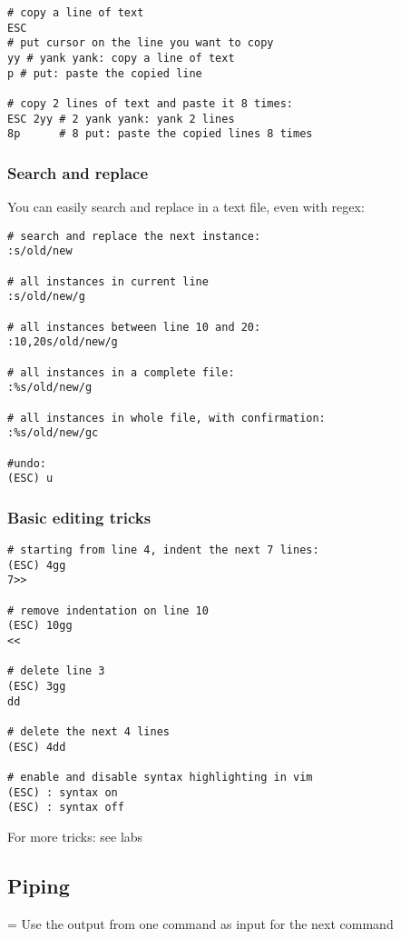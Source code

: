 \documentclass{article}
\begin{document}
\begin{verbatim}
# copy a line of text
ESC
# put cursor on the line you want to copy
yy # yank yank: copy a line of text
p # put: paste the copied line

# copy 2 lines of text and paste it 8 times:
ESC 2yy # 2 yank yank: yank 2 lines
8p      # 8 put: paste the copied lines 8 times
\end{verbatim}

\subsubsection{Search and replace}

You can easily search and replace in a text file, even with regex:

\begin{verbatim}
# search and replace the next instance:
:s/old/new

# all instances in current line
:s/old/new/g

# all instances between line 10 and 20:
:10,20s/old/new/g

# all instances in a complete file:
:%s/old/new/g

# all instances in whole file, with confirmation:
:%s/old/new/gc

#undo:
(ESC) u
\end{verbatim}

\subsubsection{Basic editing tricks}

\begin{verbatim}
# starting from line 4, indent the next 7 lines:
(ESC) 4gg
7>>

# remove indentation on line 10
(ESC) 10gg
<<

# delete line 3
(ESC) 3gg
dd

# delete the next 4 lines
(ESC) 4dd

# enable and disable syntax highlighting in vim
(ESC) : syntax on
(ESC) : syntax off
\end{verbatim}

For more tricks: see labs

\subsection{Piping}

= Use the output from one command as input for the next command
\end{document}
